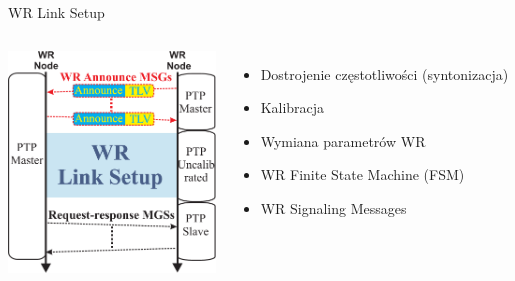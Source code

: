 \documentclass[compress,red]{beamer}
\begin{document}
%
%
%
%
%
\begin{frame}{WR Link Setup }

  \begin{columns}[c]

      \begin{center}
      \includegraphics[width=5.5cm]{protocol/wrLinkSetup.pdf}
      \end{center}



      \begin{itemize}
	\item Dostrojenie częstotliwości (syntonizacja)
	\item Kalibracja
	\item Wymiana parametrów WR
	\item WR Finite State Machine (FSM)
	\item WR Signaling Messages
      \end{itemize}

  \end{columns}

\end{frame}
\end{document}
